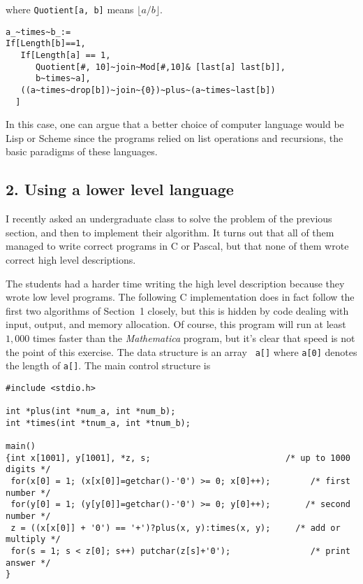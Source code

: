 \begin{boxedtext}
\end{boxedtext}

\noindent
where \verb+Quotient[a, b]+ means $\lfloor a/b\rfloor$. 

\medskip\noindent
\begin{boxedtext}
{\small
\begin{verbatim}
a_~times~b_:= 
If[Length[b]==1, 
   If[Length[a] == 1, 
      Quotient[#, 10]~join~Mod[#,10]& [last[a] last[b]], 
      b~times~a], 
   ((a~times~drop[b])~join~{0})~plus~(a~times~last[b])
  ]     
\end{verbatim}
}
\end{boxedtext}

\smallskip\noindent
In this case, one can argue that a better choice of computer
language would be Lisp or Scheme since the programs relied
on list operations and recursions, the basic paradigms of these languages.


\subsection*{2. Using a lower level language}

I recently asked an undergraduate class to solve the problem of the
previous section, and then to implement their algorithm.  It turns out
that all of them managed to write correct programs in C or Pascal, but
that none of them wrote correct high level descriptions. 

The students had a harder time writing the high level description
because they wrote low level programs. The following C implementation
does in fact follow the first two algorithms of Section~1 closely, but
this is hidden by code dealing with input, output, and memory
allocation.  Of course, this program will run at least $1,000$ times
faster than the {\sl Mathematica\/} program, but it's clear that speed
is not the point of this exercise. The data structure is an array {\tt
a[]} where {\tt a[0]} denotes the length of {\tt a[]}.  The main
control structure is

\begin{boxedtext}
\noindent
{\small
\begin{verbatim}
#include <stdio.h>

int *plus(int *num_a, int *num_b);
int *times(int *tnum_a, int *tnum_b); 

main()
{int x[1001], y[1001], *z, s;                           /* up to 1000 digits */
 for(x[0] = 1; (x[x[0]]=getchar()-'0') >= 0; x[0]++);        /* first number */
 for(y[0] = 1; (y[y[0]]=getchar()-'0') >= 0; y[0]++);       /* second number */
 z = ((x[x[0]] + '0') == '+')?plus(x, y):times(x, y);     /* add or multiply */
 for(s = 1; s < z[0]; s++) putchar(z[s]+'0');                /* print answer */
}
\end{verbatim}
}
\end{boxedtext}

